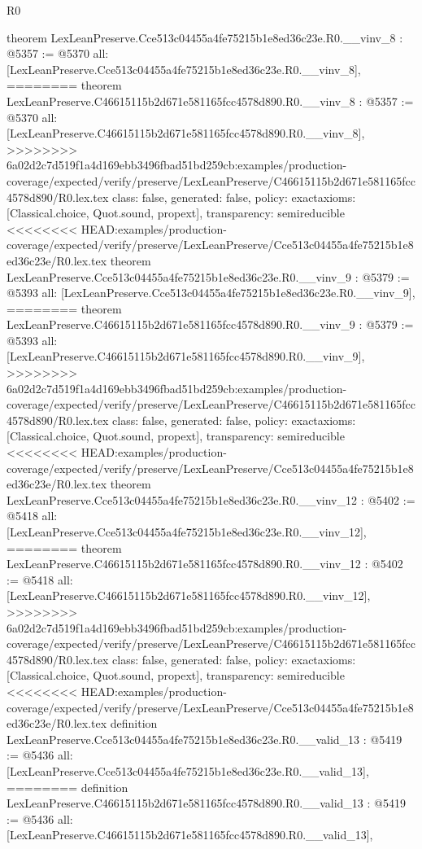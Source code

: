 \begin{lexlean}{R0}
\begin{coremodule}
{{{{{{{{{{{{{{{{{{{{{{{{{{{{{{{{{{{{{{{{{{{{{{{{{{{{{{{{{{{{{{{{{{{{{{{{{{{theorem LexLeanPreserve.Cce513c04455a4fe75215b1e8ed36c23e.R0.__vinv_8 : @5357 := @5370 {
  all: [LexLeanPreserve.Cce513c04455a4fe75215b1e8ed36c23e.R0.__vinv_8],
========
theorem LexLeanPreserve.C46615115b2d671e581165fcc4578d890.R0.__vinv_8 : @5357 := @5370 {
  all: [LexLeanPreserve.C46615115b2d671e581165fcc4578d890.R0.__vinv_8],
>>>>>>>> 6a02d2c7d519f1a4d169ebb3496fbad51bd259cb:examples/production-coverage/expected/verify/preserve/LexLeanPreserve/C46615115b2d671e581165fcc4578d890/R0.lex.tex
  class: false,
  generated: false,
  policy: exact{axioms: [Classical.choice, Quot.sound, propext]},
  transparency: semireducible
}
<<<<<<<< HEAD:examples/production-coverage/expected/verify/preserve/LexLeanPreserve/Cce513c04455a4fe75215b1e8ed36c23e/R0.lex.tex
theorem LexLeanPreserve.Cce513c04455a4fe75215b1e8ed36c23e.R0.__vinv_9 : @5379 := @5393 {
  all: [LexLeanPreserve.Cce513c04455a4fe75215b1e8ed36c23e.R0.__vinv_9],
========
theorem LexLeanPreserve.C46615115b2d671e581165fcc4578d890.R0.__vinv_9 : @5379 := @5393 {
  all: [LexLeanPreserve.C46615115b2d671e581165fcc4578d890.R0.__vinv_9],
>>>>>>>> 6a02d2c7d519f1a4d169ebb3496fbad51bd259cb:examples/production-coverage/expected/verify/preserve/LexLeanPreserve/C46615115b2d671e581165fcc4578d890/R0.lex.tex
  class: false,
  generated: false,
  policy: exact{axioms: [Classical.choice, Quot.sound, propext]},
  transparency: semireducible
}
<<<<<<<< HEAD:examples/production-coverage/expected/verify/preserve/LexLeanPreserve/Cce513c04455a4fe75215b1e8ed36c23e/R0.lex.tex
theorem LexLeanPreserve.Cce513c04455a4fe75215b1e8ed36c23e.R0.__vinv_12 : @5402 := @5418 {
  all: [LexLeanPreserve.Cce513c04455a4fe75215b1e8ed36c23e.R0.__vinv_12],
========
theorem LexLeanPreserve.C46615115b2d671e581165fcc4578d890.R0.__vinv_12 : @5402 := @5418 {
  all: [LexLeanPreserve.C46615115b2d671e581165fcc4578d890.R0.__vinv_12],
>>>>>>>> 6a02d2c7d519f1a4d169ebb3496fbad51bd259cb:examples/production-coverage/expected/verify/preserve/LexLeanPreserve/C46615115b2d671e581165fcc4578d890/R0.lex.tex
  class: false,
  generated: false,
  policy: exact{axioms: [Classical.choice, Quot.sound, propext]},
  transparency: semireducible
}
<<<<<<<< HEAD:examples/production-coverage/expected/verify/preserve/LexLeanPreserve/Cce513c04455a4fe75215b1e8ed36c23e/R0.lex.tex
definition LexLeanPreserve.Cce513c04455a4fe75215b1e8ed36c23e.R0.__valid_13 : @5419 := @5436 {
  all: [LexLeanPreserve.Cce513c04455a4fe75215b1e8ed36c23e.R0.__valid_13],
========
definition LexLeanPreserve.C46615115b2d671e581165fcc4578d890.R0.__valid_13 : @5419 := @5436 {
  all: [LexLeanPreserve.C46615115b2d671e581165fcc4578d890.R0.__valid_13],
}}}}}}}}}}}}}}}}}}}}}}}}}}}}}}}}}}}}}}}}}}}}}}}}}}}}}}}}}}}}}}}}}}}}}}}}}}}}}}}}
\end{coremodule}
\end{lexlean}
